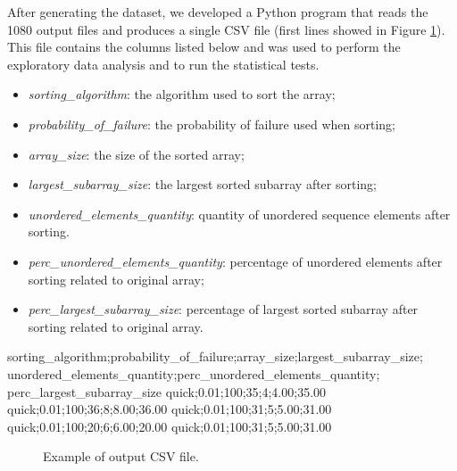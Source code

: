 After generating the dataset, we developed a Python program that reads the 1080 output files and produces a single CSV file (first lines showed in Figure \ref{fig-output-csv-file-example}). This file contains the columns listed below and was used to perform the exploratory data analysis and to run the statistical tests.
\begin{itemize}
    \item \textit{sorting\_algorithm}: the algorithm used to sort the array;
    \item \textit{probability\_of\_failure}: the probability of failure used when sorting;
    \item \textit{array\_size}: the size of the sorted array;
    \item \textit{largest\_subarray\_size}: the largest sorted subarray after sorting;
    \item \textit{unordered\_elements\_quantity}: quantity of unordered sequence elements after sorting.
    \item \textit{perc\_unordered\_elements\_quantity}: percentage of unordered elements after sorting related to original array;
    \item \textit{perc\_largest\_subarray\_size}: percentage of largest sorted subarray after sorting related to original array.
\end{itemize}

\begin{verbbox}[\mbox{}]
sorting_algorithm;probability_of_failure;array_size;largest_subarray_size;
unordered_elements_quantity;perc_unordered_elements_quantity;
perc_largest_subarray_size
quick;0.01;100;35;4;4.00;35.00
quick;0.01;100;36;8;8.00;36.00
quick;0.01;100;31;5;5.00;31.00
quick;0.01;100;20;6;6.00;20.00
quick;0.01;100;31;5;5.00;31.00
\end{verbbox}
        
\begin{figure}[H]
    \centering
    \fbox{
    \theverbbox
    }
    \caption{Example of output CSV file.}
    \label{fig-output-csv-file-example}
\end{figure}

